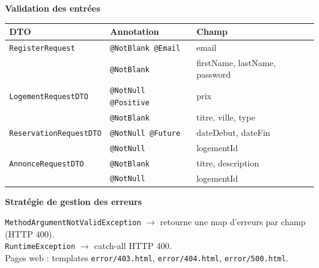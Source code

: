 \documentclass[12pt,a4paper]{article}
\newcommand{\subtitle}[1]{%
    \vspace{0.4em}\noindent%
    \textcolor{primary!80!black}{\bfseries #1}\par\vspace{0.2em}%
}
\begin{document}
\subtitle{Validation des entrées}
\begin{center}
\begin{tabularx}{\textwidth}{l l X}
\toprule
\textbf{DTO} & \textbf{Annotation} & \textbf{Champ} \\
\midrule
\texttt{RegisterRequest} & \texttt{@NotBlank @Email} & email \\
 & \texttt{@NotBlank} & firstName, lastName, password \\
\texttt{LogementRequestDTO} & \texttt{@NotNull @Positive} & prix \\
 & \texttt{@NotBlank} & titre, ville, type \\
\texttt{ReservationRequestDTO} & \texttt{@NotNull @Future} & dateDebut, dateFin \\
 & \texttt{@NotNull} & logementId \\
\texttt{AnnonceRequestDTO} & \texttt{@NotBlank} & titre, description \\
 & \texttt{@NotNull} & logementId \\
\bottomrule
\end{tabularx}
\end{center}

\subtitle{Stratégie de gestion des erreurs}

\begin{center}
\end{center}

\vspace{0.3em}
\texttt{MethodArgumentNotValidException} $\to$ retourne une map d'erreurs par champ (HTTP 400).\\
\texttt{RuntimeException} $\to$ catch-all HTTP 400.\\
Pages web : templates \texttt{error/403.html}, \texttt{error/404.html}, \texttt{error/500.html}.
\end{document}
